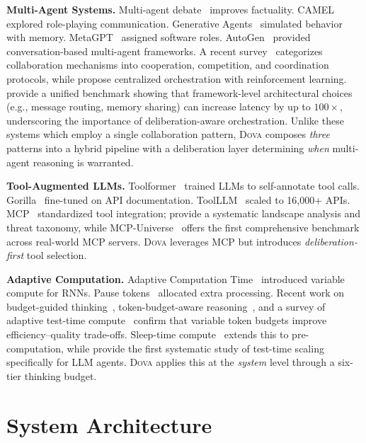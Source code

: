 \documentclass{article}
\theoremstyle{plain}
\theoremstyle{definition}
\newcommand{\dova}{\textsc{Dova}}
\begin{document}
\textbf{Multi-Agent Systems.}\quad
Multi-agent debate~\citep{du2023debate,liang2023debate} improves factuality.
CAMEL~\citep{li2023camel} explored role-playing communication.
Generative Agents~\citep{park2023generative} simulated behavior with memory.
MetaGPT~\citep{hong2023metagpt} assigned software roles.
AutoGen~\citep{wu2023autogen} provided conversation-based multi-agent
frameworks.  A recent survey~\citep{tran2025multiagent} categorizes collaboration mechanisms
into cooperation, competition, and coordination protocols, while
\citet{dang2025evolving} propose centralized orchestration with reinforcement
learning.  \citet{orogat2026multiagent} provide a unified benchmark showing that
framework-level architectural choices (e.g., message routing, memory sharing) can
increase latency by up to $100\times$, underscoring the importance of
deliberation-aware orchestration.
Unlike these systems which employ a single collaboration pattern,
\dova{} composes \emph{three} patterns into a hybrid pipeline with a
deliberation layer determining \emph{when} multi-agent reasoning is warranted.

\textbf{Tool-Augmented LLMs.}\quad
Toolformer~\citep{schick2023toolformer} trained LLMs to self-annotate tool
calls.  Gorilla~\citep{patil2023gorilla} fine-tuned on API documentation.
ToolLLM~\citep{qin2023toolllm} scaled to 16,000+ APIs.
MCP~\citep{anthropic2024mcp} standardized tool integration;
\citet{hou2025mcp} provide a systematic landscape analysis and threat taxonomy,
while MCP-Universe~\citep{luo2025mcpuniverse} offers the first comprehensive
benchmark across real-world MCP servers.
\dova{} leverages MCP but introduces \emph{deliberation-first} tool selection.

\textbf{Adaptive Computation.}\quad
Adaptive Computation Time~\citep{graves2016adaptive} introduced variable
compute for RNNs.  Pause tokens~\citep{goyal2023think} allocated extra
processing.  Recent work on budget-guided
thinking~\citep{li2025budget}, token-budget-aware
reasoning~\citep{han2024tokenbudget}, and a survey of adaptive test-time
compute~\citep{alomrani2025reasoning} confirm that variable token budgets
improve efficiency--quality trade-offs.  Sleep-time
compute~\citep{lin2025sleeptime} extends this to pre-computation, while
\citet{zhu2025scaling} provide the first systematic study of test-time scaling
specifically for LLM agents.
\dova{} applies this at the \emph{system} level through a
six-tier thinking budget.

\section{System Architecture}\label{sec:arch}
\end{document}
